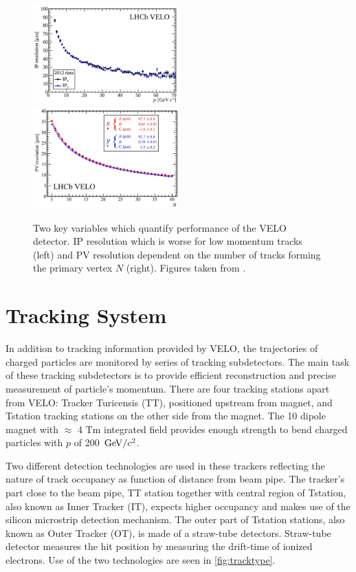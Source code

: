 \begin{figure}[!h]
	\centering
	\includegraphics[width = 0.5\textwidth]{figs/detector/IPresmhm.eps}%
        \includegraphics[width = 0.5\textwidth]{figs/detector/PVres.eps}
	\caption{Two key variables which quantify performance of the \Gls{VELO} detector. \Gls{IP} resolution which is worse for low momentum tracks (left) and \Gls{PV} resolution dependent on the number of tracks forming the primary vertex $N$ (right). Figures taken from \cite{LHCbVELOGroup:2014uea}.}
	\label{fig:veloIPres}
\end{figure}


\section{Tracking System }
In addition to tracking information provided by \Gls{VELO}, the trajectories of charged particles are monitored by series of tracking subdetectors. The main task of these tracking subdetectors is to provide efficient reconstruction and precise measurement of particle's momentum. There are four tracking stations apart from \Gls{VELO}: Tracker Turicensis (\Gls{TT}), positioned upstream from magnet, and  \Gls{Tstation} tracking stations on the other side from the magnet. The 10 \m dipole magnet with $\approx$ 4 Tm integrated field provides enough strength to bend charged particles with $p$ of 200 $\mathrm{\,Ge\kern -0.1em V}/c^{2}$.      

 Two different detection technologies are used in these trackers reflecting the nature of track occupancy as function of distance from beam pipe. The tracker's part close to the beam pipe, \Gls{TT} station together with central region of \Gls{Tstation}, also known as Inner Tracker (\Gls{IT}), expects higher occupancy and makes use of the silicon microstrip detection mechanism. The outer part of \Gls{Tstation} stations, also known as Outer Tracker (\Gls{OT}), is made of a straw-tube detectors. Straw-tube detector measures the hit position by measuring the drift-time of ionized electrons. Use of the two technologies are seen in \autoref{fig:tracktype}. 

